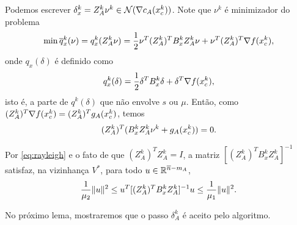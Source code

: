 Podemos escrever $\delta_x^k = Z_A^k\nu^k \in \mathcal{N}(\nabla c_A(x_c^{k}))$. Note que $\nu^k$ é
 minimizador do problema
$$\min \overline{q}_x^k(\nu) = q_x^k(Z_A^k\nu) = \frac{1}{2}\nu^T(Z_A^k)^TB_x^kZ_A^k\nu +
 \nu^T(Z_A^k)^T\nabla f(x_c^{k}),$$
onde $q_x(\delta)$ é definido como
$$q_x^k(\delta) = \frac{1}{2}\delta^TB_x^k\delta + \delta^T \nabla f(x_c^k),$$
isto é, a parte de $q^k(\delta)$ que não envolve $s$ ou $\mu$.
Então, como $(Z_A^k)^T\nabla f(x_c^{k}) = (Z_A^k)^Tg_A(x_c^{k})$, temos
\begin{eqnarray}
 (Z_A^k)^T(B_x^k Z_A^k\nu^k + g_A(\xc{k})) = 0.\visiblelbl{eq:solnu}
\end{eqnarray}

Por \eqref{eq:rayleigh} e o fato de que $(Z_A^k)^TZ_A^k = I$, a matriz $[(Z_A^k)^T B_x^k
 Z_A^k]^{-1}$ satisfaz, na vizinhança $V^*$, para todo $u \in \mathbb{R}^{\overline{n}-m_A}$,
 \begin{eqnarray}
 \frac{1}{\mu_2}\norma{u}^2 \leq u^T[(Z_A^k)^T B_x^k Z_A^k]^{-1}u \leq \frac{1}
{\mu_1}\norma{u}^2.\visiblelbl{eq:rayinversa}
\end{eqnarray}

No próximo lema, mostraremos que o passo $\delta_A^k$ é aceito pelo algoritmo.

